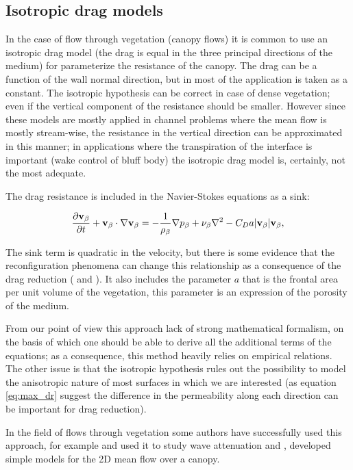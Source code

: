 \subsection{Isotropic drag models}
\label{sec:canopy_eq}

In the case of flow through vegetation (canopy flows) it is common to use an isotropic drag model (the drag is equal in the three principal directions of the medium) for parameterize the resistance of the canopy.
The drag can be a function of the wall normal direction, but in most of the application is taken as a constant.
The isotropic hypothesis can be correct in case of dense vegetation; even if the vertical component of the resistance should be smaller.
However since these models are mostly applied in channel problems where the mean flow is mostly stream-wise, the resistance in the vertical direction can be approximated in this manner; in applications where the transpiration of the interface is important (wake control of bluff body) the isotropic drag model is, certainly, not the most adequate.

The drag resistance is included in the Navier-Stokes equations as a sink:

\begin{equation}
\dfrac{\partial \textbf{v}_{\beta}}{\partial t} + \textbf{v}_{\beta} \cdot \nabla \textbf{v}_{\beta} = -\frac{1}{\rho_{\beta}} \nabla p_{\beta} + \nu_{\beta} \nabla^2 -C_D a |\textbf{v}_{\beta}| \textbf{v}_{\beta}, 
\label{eq:mom_cd}
\end{equation}

The sink term is quadratic in the velocity, but there is some evidence that the reconfiguration phenomena can change this relationship as a consequence of the drag reduction (\citet{gosselin2011drag} and \citet{alvarado2017nature}).
It also includes the parameter $a$ that is the frontal area per unit volume of the vegetation, this parameter is an expression of the porosity of the medium.

From our point of view this approach lack of strong mathematical formalism, on the basis of which one should be able to derive all the additional terms of the equations; as a consequence, this method heavily relies on empirical relations.
The other issue is that the isotropic hypothesis rules out the possibility to model the anisotropic nature of most surfaces in which we are interested (as equation \eqref{eq:max_dr} suggest the difference in the permeability along each direction can be important for drag reduction).

In the field of flows through vegetation some authors have successfully used this approach, for example \citet{maza2013coupled} and \citet{maza2015tsunami} used it to study wave attenuation and \citet{ghisalberti2004limited}, \citet{battiato2014single} developed simple models for the 2D mean flow over a canopy.


